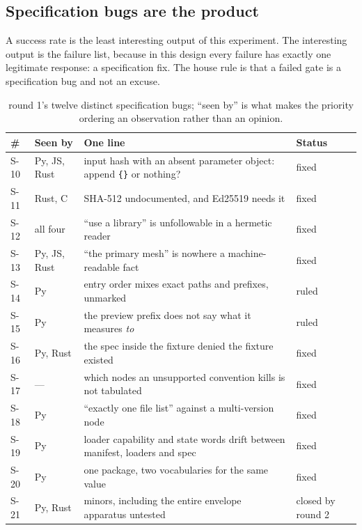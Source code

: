 \documentclass[10pt,twocolumn,letterpaper]{article}
\newcommand{\code}[1]{\texttt{\small #1}}
\begin{document}
\subsection{Specification bugs are the product}

A success rate is the least interesting output of this experiment. The interesting output is the failure list, because in this design every failure has exactly one legitimate response: a specification fix. The house rule is that a failed gate is a specification bug and not an excuse.

\begin{table}[t]\centering\footnotesize
\caption{round 1's twelve distinct specification bugs; ``seen by'' is what makes the priority ordering an observation rather than an opinion.}
\begin{tabular}{@{}l l L{3.9cm} l@{}}
\toprule
\# & Seen by & One line & Status \\
\midrule
S-10 & Py, JS, Rust & input hash with an absent parameter object: append \code{\{\}} or nothing? & fixed \\
S-11 & Rust, C & SHA-512 undocumented, and Ed25519 needs it & fixed \\
S-12 & all four & ``use a library'' is unfollowable in a hermetic reader & fixed \\
S-13 & Py, JS, Rust & ``the primary mesh'' is nowhere a machine-readable fact & fixed \\
S-14 & Py & entry order mixes exact paths and prefixes, unmarked & ruled \\
S-15 & Py & the preview prefix does not say what it measures \emph{to} & ruled \\
S-16 & Py, Rust & the spec inside the fixture denied the fixture existed & fixed \\
S-17 & --- & which nodes an unsupported convention kills is not tabulated & fixed \\
S-18 & Py & ``exactly one file list'' against a multi-version node & fixed \\
S-19 & Py & loader capability and state words drift between manifest, loaders and spec & fixed \\
S-20 & Py & one package, two vocabularies for the same value & fixed \\
S-21 & Py, Rust & minors, including the entire envelope apparatus untested & closed by round 2 \\
\bottomrule
\end{tabular}
\end{table}
\end{document}
